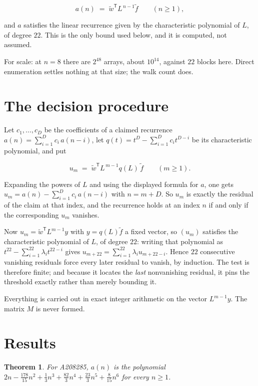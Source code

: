 \documentclass[11pt]{article}
\newtheorem{theorem}{Theorem}
\theoremstyle{definition}
\begin{document}
\[a(n) \;=\; \tilde w^{\mathsf T} L^{\,n-1} \tilde f \qquad (n \ge 1),\]

and $a$ satisfies the linear recurrence given by the characteristic polynomial of $L$, of degree $22$. This is the only bound used below, and it is computed, not assumed.

For scale: at $n = 8$ there are $2^{48}$ arrays, about $10^{14}$, against $22$ blocks here. Direct enumeration settles nothing at that size; the walk count does.

\section{The decision procedure}

Let $c_1,\dots,c_D$ be the coefficients of a claimed recurrence $a(n) = \sum_{i=1}^{D} c_i\,a(n-i)$, let $q(t) = t^{D} - \sum_{i=1}^{D} c_i t^{D-i}$ be its characteristic polynomial, and put

\[u_m \;=\; \tilde w^{\mathsf T} L^{\,m-1} q(L)\,\tilde f \qquad (m \ge 1).\]

Expanding the powers of $L$ and using the displayed formula for $a$, one gets $u_m = a(n) - \sum_{i=1}^{D} c_i\,a(n-i)$ with $n = m + D$. So $u_m$ is exactly the residual of the claim at that index, and the recurrence holds at an index $n$ if and only if the corresponding $u_m$ vanishes.

Now $u_m = \tilde w^{\mathsf T} L^{m-1} y$ with $y = q(L)\tilde f$ a fixed vector, so $(u_m)$ satisfies the characteristic polynomial of $L$, of degree $22$: writing that polynomial as $t^{22} - \sum_{i=1}^{22} \lambda_i t^{22-i}$ gives $u_{m+22} = \sum_{i=1}^{22} \lambda_i u_{m+22-i}$. Hence $22$ consecutive vanishing residuals force every later residual to vanish, by induction. The test is therefore finite; and because it locates the {\itshape last} nonvanishing residual, it pins the threshold exactly rather than merely bounding it.

Everything is carried out in exact integer arithmetic on the vector $L^{m-1}y$. The matrix $M$ is never formed.

\section{Results}

\begin{theorem} For A208285, $a(n)$ is the polynomial $2n - \frac{178}{15}n^{2} + \frac{1}{3}n^{3} + \frac{82}{3}n^{4} + \frac{23}{3}n^{5} + \frac{8}{15}n^{6}$ for every $n \ge 1$.\end{theorem}
\end{document}
